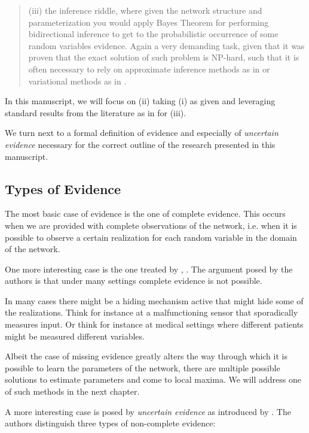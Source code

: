 \documentclass[11pt]{article}
\begin{document}
\begin{article}
\begin{quote}
(iii) the inference riddle, where given the network structure and
parameterization you would apply Bayes Theorem for performing
bidirectional inference to get to the probabilistic occurrence of
some random variables evidence. Again a very demanding task, given
that it was proven that the exact solution of such problem is NP-hard,
such that it is often necessary to rely on approximate inference
methods as in \cite{pearl1987evidential} or variational methods as in
\cite{jordan1999introduction}.
\end{quote}


In this manuscript, we will focus on (ii) taking (i) as given and
leveraging standard results from the literature as in
\cite{koller2009probabilistic} for (iii).

We turn next to a formal definition of evidence and especially of
\emph{uncertain evidence} necessary for the correct outline of the
research presented in this manuscript.

\subsection{Types of Evidence}
\label{sec:orgcca7c0c}

The most basic case of evidence is the one of complete
evidence. This occurs when we are provided with complete
observations of the network, i.e.  when it is possible to observe a
certain realization for each random variable in the domain of the
network.

One more interesting case is the one treated by \cite{Mrad_2015},
\cite{Wasserkrug_all}. The argument posed by the authors is that under
many settings complete evidence is not possible.

In many cases there might be a hiding mechanism active that might
hide some of the realizations. Think for instance at a
malfunctioning sensor that sporadically measures input. Or think for
instance at medical settings where different patients might be
measured different variables.

Albeit the case of missing evidence greatly alters the way through
which it is possible to learn the parameters of the network, there
are multiple possible solutions to estimate parameters and come to
local maxima. We will address one of such methods in the next
chapter.

A more interesting case is posed by \emph{uncertain evidence} as
introduced by \cite{Mrad_2015}. The authors distinguish three types of
non-complete evidence:


\end{article}
\end{document}
